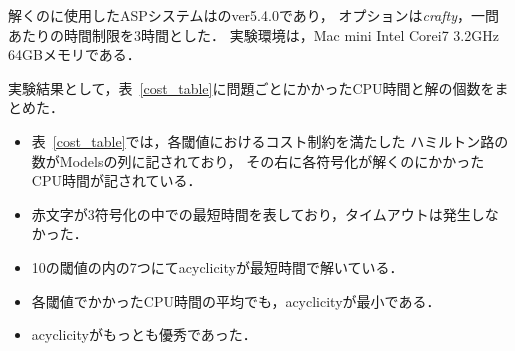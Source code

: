 解くのに使用したASPシステムは{\clingo}のver5.4.0であり，
オプションは\textit{crafty}，一問あたりの時間制限を3時間とした．
実験環境は，Mac mini Intel Corei7 3.2GHz 64GBメモリである．

実験結果として，表~\ref{cost_table}に問題ごとにかかったCPU時間と解の個数をまとめた．

\begin{itemize}
\item 表~\ref{cost_table}では，各閾値におけるコスト制約を満たした
  ハミルトン路の数がModelsの列に記されており，
  その右に各符号化が解くのにかかったCPU時間が記されている．
\item 赤文字が3符号化の中での最短時間を表しており，タイムアウトは発生しなかった．
\item 10の閾値の内の7つにて\textsf{acyclicity}が最短時間で解いている．
\item 各閾値でかかったCPU時間の平均でも，\textsf{acyclicity}が最小である．
\item \textsf{acyclicity}がもっとも優秀であった．
\end{itemize}


